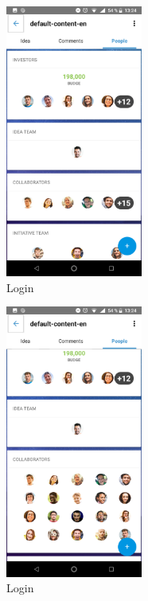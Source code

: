 \begin{figure}[!h]
	\begin{center}
		\includegraphics[width=0.4\textwidth]{./img/anexo1/ver_idea_gente.png}
		\caption{Login}
		\label{fig:ver_idea_gente}
	\end{center}
\end{figure}

\begin{figure}[!h]
	\begin{center}
		\includegraphics[width=0.4\textwidth]{./img/anexo1/ver_idea_gente_expandido.png}
		\caption{Login}
		\label{fig:ver_idea_gente_expandido}
	\end{center}
\end{figure}


